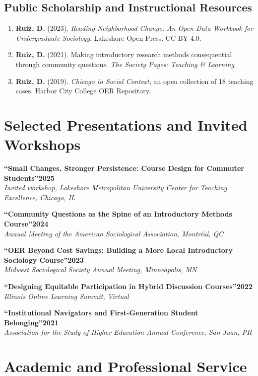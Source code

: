 \documentclass[10pt,letterpaper]{article}
\newcommand{\talk}[3]{%
  \Needspace{3\baselineskip}%
  \textbf{#1}\hfill\textbf{#2}\\[-1pt]
  \textit{#3}\par
}
\begin{document}
\subsection*{Public Scholarship and Instructional Resources}
\begin{enumerate}
  \item \textbf{Ruiz, D.} (2023). \textit{Reading Neighborhood Change: An Open Data Workbook for Undergraduate Sociology}. Lakeshore Open Press. CC BY 4.0.
  \item \textbf{Ruiz, D.} (2021). Making introductory research methods consequential through community questions. \textit{The Society Pages: Teaching \& Learning}.
  \item \textbf{Ruiz, D.} (2019). \textit{Chicago in Social Context}, an open collection of 18 teaching cases. Harbor City College OER Repository.
\end{enumerate}

\section*{Selected Presentations and Invited Workshops}

\talk{``Small Changes, Stronger Persistence: Course Design for Commuter Students''}{2025}{Invited workshop, Lakeshore Metropolitan University Center for Teaching Excellence, Chicago, IL}
\vspace{4pt}
\talk{``Community Questions as the Spine of an Introductory Methods Course''}{2024}{Annual Meeting of the American Sociological Association, Montréal, QC}
\vspace{4pt}
\talk{``OER Beyond Cost Savings: Building a More Local Introductory Sociology Course''}{2023}{Midwest Sociological Society Annual Meeting, Minneapolis, MN}
\vspace{4pt}
\talk{``Designing Equitable Participation in Hybrid Discussion Courses''}{2022}{Illinois Online Learning Summit, Virtual}
\vspace{4pt}
\talk{``Institutional Navigators and First-Generation Student Belonging''}{2021}{Association for the Study of Higher Education Annual Conference, San Juan, PR}

\section*{Academic and Professional Service}
\end{document}
